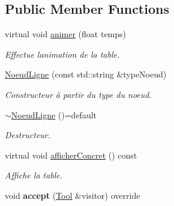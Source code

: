 \subsection*{Public Member Functions}
\begin{DoxyCompactItemize}
\item 
\hypertarget{class_noeud_ligne_af2435007b74c481fa1f3c898a2fa793d}{}virtual void \hyperlink{class_noeud_ligne_af2435007b74c481fa1f3c898a2fa793d}{animer} (float temps)\label{class_noeud_ligne_af2435007b74c481fa1f3c898a2fa793d}

\begin{DoxyCompactList}\small\item\em Effectue l\textquotesingle{}animation de la table. \end{DoxyCompactList}\end{DoxyCompactItemize}
{\bf }\par
\begin{DoxyCompactItemize}
\item 
\hypertarget{class_noeud_ligne_ae8bead463f4616abc90d29923226a92f}{}\hyperlink{class_noeud_ligne_ae8bead463f4616abc90d29923226a92f}{Noeud\+Ligne} (const std\+::string \&type\+Noeud)\label{class_noeud_ligne_ae8bead463f4616abc90d29923226a92f}

\begin{DoxyCompactList}\small\item\em Constructeur à partir du type du noeud. \end{DoxyCompactList}\item 
\hypertarget{class_noeud_ligne_a723fc18a3736400bac97a31b9742854e}{}\hyperlink{class_noeud_ligne_a723fc18a3736400bac97a31b9742854e}{$\sim$\+Noeud\+Ligne} ()=default\label{class_noeud_ligne_a723fc18a3736400bac97a31b9742854e}

\begin{DoxyCompactList}\small\item\em Destructeur. \end{DoxyCompactList}\item 
\hypertarget{class_noeud_ligne_a727a134065eeb6b101ad020a15a92a19}{}virtual void \hyperlink{class_noeud_ligne_a727a134065eeb6b101ad020a15a92a19}{afficher\+Concret} () const \label{class_noeud_ligne_a727a134065eeb6b101ad020a15a92a19}

\begin{DoxyCompactList}\small\item\em Affiche la table. \end{DoxyCompactList}\item 
\hypertarget{class_noeud_ligne_a52921de81dde65f619ba5322cc9d0953}{}void {\bfseries accept} (\hyperlink{class_tool}{Tool} \&visitor) override\label{class_noeud_ligne_a52921de81dde65f619ba5322cc9d0953}

\end{DoxyCompactItemize}

